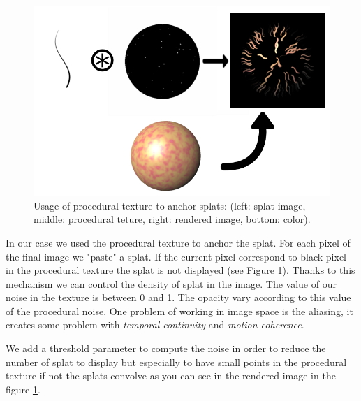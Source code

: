 
\begin{figure}
    \begin{center}
    \includegraphics[scale=0.6]{images/noise/addition.png}
    \end{center}
    \caption{Usage of procedural texture to anchor splats: (left: splat image, middle: procedural teture, right: rendered image, bottom: color).}
    \label{procedural_noise_anchor}
\end{figure}

In our case we used the procedural texture to anchor the splat. For each pixel of the final image we "paste" a splat. If the current pixel correspond to black pixel in the procedural texture the splat is not displayed (see Figure \ref{procedural_noise_anchor}). Thanks to this mechanism we can control the density of splat in the image. The value of our noise in the texture is between 0 and 1. The opacity vary according to this value of the procedural noise. One problem of working in image space is the aliasing, it creates some problem with \textit{temporal continuity} and \textit{motion coherence}.

We add a threshold parameter to compute the noise in order to reduce the number of splat to display but especially to have small points in the procedural texture if not the splats convolve as you can see in the rendered image in the figure \ref{procedural_noise_anchor}.


